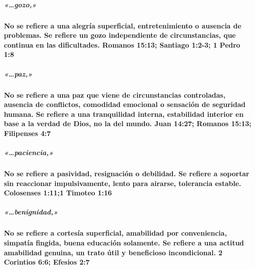 \documentclass[11a pt,twoside]{article}
\newcommand{\scripture}[1]{%
  {\fontsize{12pt}{16pt}\selectfont\ScriptureFont\itshape #1}%
}
\let\oldparagraph\paragraph
\renewcommand{\paragraph}{\needspace{3\baselineskip}\oldparagraph}
\let\oldsubparagraph\subparagraph
\renewcommand{\subparagraph}{\needspace{2\baselineskip}\oldsubparagraph}
\begin{document}
\subparagraph{\texorpdfstring{\scripture{«…gozo,»}}{}}\label{gozo}

\paragraph{No se refiere a una alegría superficial, entretenimiento o
ausencia de problemas. Se refiere un gozo independiente de
circunstancias, que continua en las dificultades. Romanos 15:13;
Santiago 1:2-3; 1 Pedro
1:8}\label{no-se-refiere-a-una-alegruxeda-superficial-entretenimiento-o-ausencia-de-problemas.-se-refiere-un-gozo-independiente-de-circunstancias-que-continua-en-las-dificultades.-romanos-1513-santiago-12-3-1-pedro-18}

\subparagraph{\texorpdfstring{\scripture{«…paz,»}}{}}\label{paz}

\paragraph{No se refiere a una paz que viene de circunstancias
controladas, ausencia de conflictos, comodidad emocional o sensación de
seguridad humana. Se refiere a una tranquilidad interna, estabilidad
interior en base a la verdad de Dios, no la del mundo. Juan 14:27;
Romanos 15:13; Filipenses
4:7}\label{no-se-refiere-a-una-paz-que-viene-de-circunstancias-controladas-ausencia-de-conflictos-comodidad-emocional-o-sensaciuxf3n-de-seguridad-humana.-se-refiere-a-una-tranquilidad-interna-estabilidad-interior-en-base-a-la-verdad-de-dios-no-la-del-mundo.-juan-1427-romanos-1513-filipenses-47}

\subparagraph{\texorpdfstring{\scripture{«…paciencia,»}}{}}\label{paciencia}

\paragraph{No se refiere a pasividad, resignación o debilidad. Se
refiere a soportar sin reaccionar impulsivamente, lento para airarse,
tolerancia estable. Colosenses 1:11;1 Timoteo
1:16}\label{no-se-refiere-a-pasividad-resignaciuxf3n-o-debilidad.-se-refiere-a-soportar-sin-reaccionar-impulsivamente-lento-para-airarse-tolerancia-estable.-colosenses-1111-timoteo-116}

\subparagraph{\texorpdfstring{\scripture{«…benignidad,»}}{}}\label{benignidad}

\paragraph{No se refiere a cortesía superficial, amabilidad por
conveniencia, simpatía fingida, buena educación solamente. Se refiere a
una actitud amabilidad genuina, un trato útil y beneficioso
incondicional. 2 Corintios 6:6; Efesios
2:7}\label{no-se-refiere-a-cortesuxeda-superficial-amabilidad-por-conveniencia-simpatuxeda-fingida-buena-educaciuxf3n-solamente.-se-refiere-a-una-actitud-amabilidad-genuina-un-trato-uxfatil-y-beneficioso-incondicional.-2-corintios-66-efesios-27}
\end{document}
